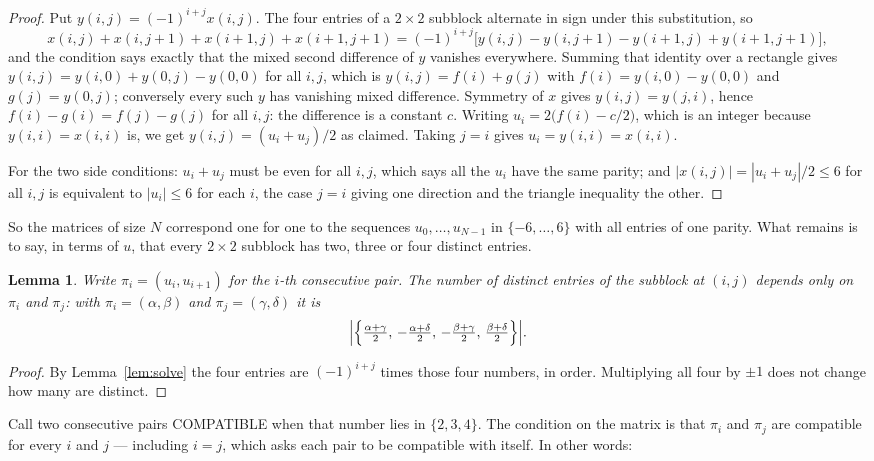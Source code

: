 \documentclass[11pt,a4paper]{article}
\theoremstyle{plain}
\newtheorem{lemma}[theorem]{Lemma}
\theoremstyle{definition}
\begin{document}
\begin{proof}
Put $y(i,j)=(-1)^{i+j}x(i,j)$. The four entries of a $2\times2$ subblock alternate in sign
under this substitution, so
\[
x(i,j)+x(i,j{+}1)+x(i{+}1,j)+x(i{+}1,j{+}1)
=(-1)^{i+j}\bigl[y(i,j)-y(i,j{+}1)-y(i{+}1,j)+y(i{+}1,j{+}1)\bigr],
\]
and the condition says exactly that the mixed second difference of $y$ vanishes everywhere.
Summing that identity over a rectangle gives
$y(i,j)=y(i,0)+y(0,j)-y(0,0)$ for all $i,j$, which is $y(i,j)=f(i)+g(j)$ with
$f(i)=y(i,0)-y(0,0)$ and $g(j)=y(0,j)$; conversely every such $y$ has vanishing mixed
difference. Symmetry of $x$ gives $y(i,j)=y(j,i)$, hence $f(i)-g(i)=f(j)-g(j)$ for all $i,j$:
the difference is a constant $c$. Writing $u_i=2\bigl(f(i)-c/2\bigr)$, which is an integer
because $y(i,i)=x(i,i)$ is, we get $y(i,j)=(u_i+u_j)/2$ as claimed. Taking $j=i$ gives
$u_i=y(i,i)=x(i,i)$.

For the two side conditions: $u_i+u_j$ must be even for all $i,j$, which says all the $u_i$ have
the same parity; and $|x(i,j)|=|u_i+u_j|/2\le6$ for all $i,j$ is equivalent to $|u_i|\le6$
for each $i$, the case $j=i$ giving one direction and the triangle inequality the other.
\end{proof}

So the matrices of size $N$ correspond one for one to the sequences $u_0,\dots,u_{N-1}$ in
$\{-6,\dots,6\}$ with all entries of one parity. What remains is to say, in terms of $u$,
that every $2\times2$ subblock has two, three or four distinct entries.

\begin{lemma}\label{lem:block}
Write $\pi_i=(u_i,u_{i+1})$ for the $i$-th consecutive pair. The number of distinct entries of
the subblock at $(i,j)$ depends only on $\pi_i$ and $\pi_j$: with $\pi_i=(\alpha,\beta)$ and
$\pi_j=(\gamma,\delta)$ it is
\[
\Bigl|\Bigl\{\tfrac{\alpha+\gamma}{2},\,-\tfrac{\alpha+\delta}{2},\,
-\tfrac{\beta+\gamma}{2},\,\tfrac{\beta+\delta}{2}\Bigr\}\Bigr| .
\]
\end{lemma}

\begin{proof}
By Lemma~\ref{lem:solve} the four entries are $(-1)^{i+j}$ times those four numbers, in
order. Multiplying all four by $\pm1$ does not change how many are distinct.
\end{proof}

Call two consecutive pairs COMPATIBLE when that number lies in $\{2,3,4\}$. The condition on the
matrix is that $\pi_i$ and $\pi_j$ are compatible for every $i$ and $j$ --- including $i=j$,
which asks each pair to be compatible with itself. In other words:
\end{document}
